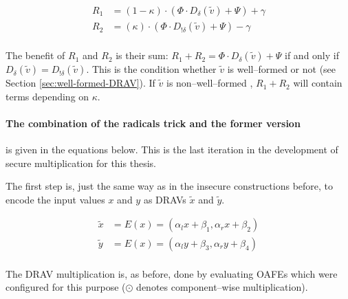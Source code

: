 \begin{align*}
  R_1 & = (1-\kappa)\cdot(\Phi \cdot D_\delta(\widetilde{v})+\Psi) + \gamma \\
  R_2 & = (\kappa)\cdot(\Phi \cdot D_{!\delta}(\widetilde{v})+\Psi) - \gamma \\
\end{align*}

\noindent{}The benefit of $R_1$ and $R_2$ is their sum: $R_1 + R_2 = \Phi \cdot
D_\delta(\widetilde{v}) + \Psi$ if and only if $D_\delta(\widetilde{v}) =
D_{!\delta}(\widetilde{v})$. This is the condition whether $\widetilde{v}$ is
well--formed or not (see Section \ref{sec:well-formed-DRAV}).  If
$\widetilde{v}$ is non--well--formed , $R_1 + R_2$ will contain terms depending
on $\kappa$.

\paragraph{The combination of the radicals trick and the former version} is
given in the equations below. This is the last iteration in the development of
secure multiplication for this thesis.

The first step is, just the same way as in the insecure constructions
before, to encode the input values $x$ and $y$ as DRAVs $\widetilde{x}$ and
$\widetilde{y}$.

\begin{align*}
  \widetilde{x} & = E(x) = (\alpha_l x + \beta_1, \alpha_r x + \beta_2) \\
  \widetilde{y} & = E(x) = (\alpha_l y + \beta_3, \alpha_r y + \beta_4) \\
\end{align*}

\noindent{}The DRAV multiplication is, as before, done by evaluating OAFEs which
were configured for this purpose ($\odot$ denotes component--wise
multiplication).

